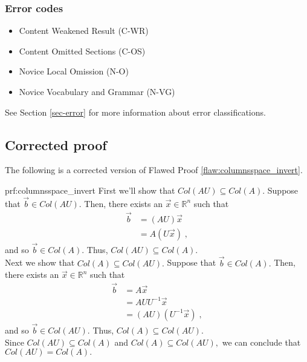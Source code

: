 \subsubsection{Error codes}
\begin{itemize}
	\item 	Content Weakened Result (C-WR)
	\item   Content Omitted Sections (C-OS)
	\item Novice Local Omission (N-O)
	\item   Novice Vocabulary and Grammar (N-VG)
\end{itemize}
See Section \ref{sec-error} for more information about error classifications.

\clearpage
\subsection{Corrected proof}

The following is a corrected version of Flawed Proof \ref{flaw:columnsspace_invert}. %

\begin{prf}{prf:columnsspace_invert} %
First we'll show that $Col(AU) \subseteq Col(A).$ Suppose that $\vec{b} \in Col(AU).$ Then, there exists an $\vec{x} \in \mathbb{R}^n$ such that
\begin{align*}
    \vec{b} &= (AU)\vec{x} \\
    &= A(U\vec{x})\;,
\end{align*}
and so $\vec{b} \in Col(A).$ Thus, $Col(AU) \subseteq Col(A).$ \\

Next we show that $Col(A) \subseteq Col(AU).$ Suppose that $\vec{b} \in Col(A).$ Then, there exists an $\vec{x} \in \mathbb{R}^n$ such that
\begin{align*}
    \vec{b} &= A\vec{x} \\
    &= AUU^{-1}\vec{x} \\
    &= (AU)(U^{-1}\vec{x})\;,
\end{align*}
and so $\vec{b} \in Col(AU).$ Thus, $Col(A) \subseteq Col(AU).$ \\

Since  $Col(AU) \subseteq Col(A)$ and  $Col(A) \subseteq Col(AU),$ we can conclude that $Col(AU)=Col(A).$
\end{prf} 